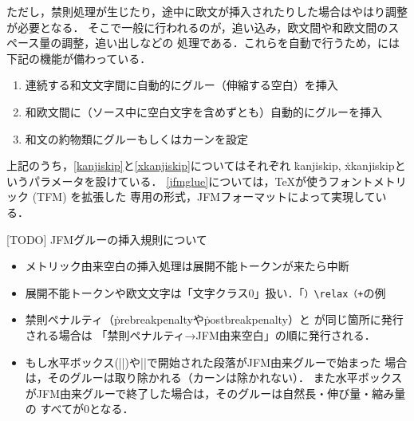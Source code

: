 \documentclass[a4paper,11pt,nomag,dvipdfmx]{jsarticle}
\begin{document}
ただし，禁則処理が生じたり，途中に欧文が挿入されたりした場合はやはり調整が必要となる．
そこで一般に行われるのが，追い込み，欧文間や和欧文間のスペース量の調整，追い出しなどの
処理である．これらを自動で行うため，\pTeX には下記の機能が備わっている．
\begin{enumerate}
\item 連続する和文文字間に自動的にグルー（伸縮する空白）を挿入\label{kanjiskip}
\item 和欧文間に（ソース中に空白文字を含めずとも）自動的にグルーを挿入\label{xkanjiskip}
\item 和文の約物類にグルーもしくはカーンを設定\label{jfmglue}
\end{enumerate}
上記のうち，\ref{kanjiskip}と\ref{xkanjiskip}についてはそれぞれ
\.{kanjiskip}, \.{xkanjiskip}というパラメータを設けている．
\ref{jfmglue}については，\TeX が使うフォントメトリック (TFM) を拡張した
\pTeX 専用の形式，JFMフォーマットによって実現している．

[TODO] JFMグルーの挿入規則について
\begin{itemize}
 \item メトリック由来空白の挿入処理は展開不能トークンが来たら中断
 \item 展開不能トークンや欧文文字は「文字クラス0」扱い．「\verb|）\relax（+|の例
 \item 禁則ペナルティ（\.{prebreakpenalty}や\.{postbreakpenalty}）と
  が同じ箇所に発行される場合は
  「禁則ペナルティ→JFM由来空白」の順に発行される．
\iffalse %
 \item より一般に，禁則ペナルティ，JFM由来空白，ベースライン補正，
  欧文TFM由来カーンが同じ箇所に発行される場合は
  次の順になる（\ref{sec:kinsoku}節の注意の一般化）．%
  \begin{itemize}
   \item 和文→欧文：禁則ペナルティ→JFM由来空白→ベースライン補正→%
   欧文TFM由来カーン
   \item 欧文→和文：ベースライン補正→禁則ペナルティ→JFM由来空白
   \footnote{[TODO] \TeX~Live~2019の\pTeX~3.8.2では，欧文TFM由来カーンは欧文→和文の
   切替時には挿入されない．}%
  \end{itemize}
\fi %
 \item もし水平ボックス(|\hbox|)や|\noindent|で開始された段落がJFM由来グルーで始まった
   場合は，そのグルーは取り除かれる（カーンは除かれない）．
   また水平ボックスがJFM由来グルーで終了した場合は，そのグルーは自然長・伸び量・縮み量の
   すべてが0となる．
\end{itemize}
\end{document}
